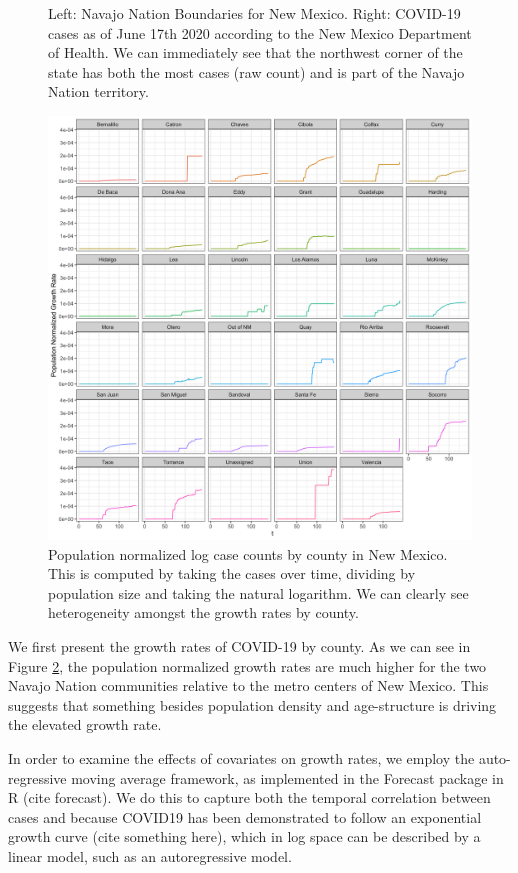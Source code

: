 \documentclass{article}
\begin{document}
{\begin{figure}
\caption{Left: Navajo Nation Boundaries for New Mexico. Right: COVID-19 cases as of June 17th 2020 according to the New Mexico Department of Health. We can immediately see that the northwest corner of the state has both the most cases (raw count) and is part of the Navajo Nation territory.  } 
\label{fig:nn}

\end{figure}

\begin{figure}
\centering
\includegraphics[scale=.15]{log_case_plot.png}
\caption{Population normalized log case counts by county in New Mexico. This is computed by taking the cases over time, dividing by population size and taking the natural logarithm. We can clearly see heterogeneity amongst the growth rates by county.   }
\label{fig:data}
\end{figure}


We first present the growth rates of COVID-19 by county.  As we can see in Figure \ref{fig:data}, the population normalized growth rates are much higher for the two Navajo Nation communities relative to the metro centers of New Mexico. This suggests that something besides population density and age-structure is driving the elevated growth rate. 


In order to examine the effects of covariates on growth rates, we employ the auto-regressive moving average framework, as implemented in the Forecast package in R (cite forecast).  We do this to capture both the temporal correlation between cases and because COVID19 has been demonstrated to follow an exponential growth curve (cite something here), which in log space can be described by a linear model, such as an autoregressive model. 

}
\end{document}
